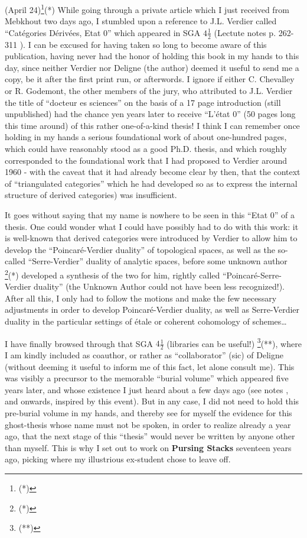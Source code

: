  (April 24)\footnote{(*)}(*)
While going through a private article which I just received from Mebkhout two days ago, I
stumbled upon a reference to J.L. Verdier called ``Cat\'egories D\'eriv\'ees, Etat 0''
which appeared in SGA $4\frac{1}{2}$
(Lectute notes 
p. 262-311 ).
I can be excused for having taken so long to become aware of this publication, 
having never had the honor of holding this book in my hands to this day, since neither
Verdier nor Deligne (the author)
deemed it useful to send me a copy, be it after the first print run, or
afterwords. I ignore if either C. Chevalley or R. Godemont, the other members of the jury,
who attributed to J.L. Verdier the title of ``docteur es sciences''
on the basis of a 17 page introduction (still unpublished) had the chance 
yen years later to receive ``L'\'etat 0'' (50 pages long this time around) of this rather
one-of-a-kind thesis!
I think I can remember once holding in my hands a serious foundational work of about
one-hundred pages, which could have reasonably stood as a good Ph.D. thesis, and which
roughly corresponded to the foundational work that I had proposed to Verdier around 1960 - 
with the caveat that it had already become clear by then, that the context of
``triangulated categories'' which he had developed so as to express the internal structure
of derived categories) was insufficient. 

It goes without saying that my name is nowhere to be seen in this ``Etat 0'' of a thesis.
One could wonder what I could have possibly had to do with this work:
it is well-known that derived categories were introduced by Verdier to allow him to develop
the ``Poincar\'e-Verdier duality'' of topological spaces,
as well as the so-called ``Serre-Verdier'' duality of analytic spaces, before some unknown
author \footnote{(*)}(*) developed a synthesis of the two for him, rightly called 
``Poincar\'e-Serre-Verdier duality''
(the Unknown Author could not have been less recognized!).
After all this, I only had to follow the motions and make the few necessary adjustments in
order to develop Poincar\'e-Verdier duality, as well as Serre-Verdier duality in the
particular settings of \'etale or coherent cohomology of schemes\ldots

I have finally browsed through that SGA $4\frac{1}{2}$ (libraries can be useful!)
\footnote{(**)}(**), where I am kindly included as coauthor, or rather as ``collaborator''
(sic) of Deligne (without deeming it useful to inform me of this fact, let alone consult
me). This was visibly a precursor to the memorable ``burial volume'' which appeared five
years later, and whose existence I just heard about a few days ago
(see notes , and onwards, inspired by this event).
But in any case, I did not need to hold this pre-burial volume in my hands, and thereby 
see for myself the evidence for this ghost-thesis whose name must not be spoken, 
in order to realize already a year ago, that the next stage of this ``thesis'' would never
be written by anyone other than myself. 
This is why I set out to work on \textbf{Pursing Stacks} 
seventeen years ago, picking where my illustrious ex-student chose to leave off. 


